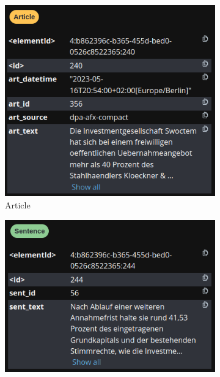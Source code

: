 \begin{figure}[H]
        \centering
        \begin{subfigure}[b]{0.475\textwidth}
            \centering
            \includegraphics[width=\textwidth]{Assets/kg-data-3-article}
            \caption{\small Article}
            \label{fig:kg-data-3-article}
        \end{subfigure}
        \hfill
        \begin{subfigure}[b]{0.475\textwidth}
            \centering
            \includegraphics[width=\textwidth]{Assets/kg-data-3-sentence}

\end{subfigure}
\end{figure}
